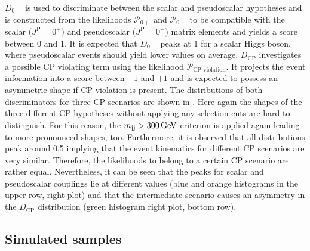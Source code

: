 $D_{0-}$ is used to discriminate between the scalar and pseudoscalar hypotheses and is constructed from the likelihoods $\mathcal{P}_{0+}$ and $\mathcal{P}_{0-}$ to be compatible with the scalar ($J^\text{P}=0^+$) and pseudoscalar ($J^\text{P}=0^-$) matrix elements and yields a score between 0 and 1. It is expected that
$D_{0-}$ peaks at 1 for a scalar Higgs boson, where pseudoscalar events should yield lower values on average. $D_\text{CP}$ investigates a possible CP violating term using the likelihood $\mathcal{P}_\text{CP violation}$. It projects the event information into a score between $-1$ and $+1$ and is expected to possess an asymmetric shape if CP violation is present.
The distributions of both discriminators for three CP scenarios
are shown in . \newline{}
Here again the shapes of the three different CP hypotheses without applying any selection cuts are hard to distinguish. For this reason, the $m_\text{jj}>\text{300\,{GeV}}$ criterion is applied again  
leading to more pronounced shapes, too.
Furthermore, it is observed that all distributions peak around 0.5 implying that the event kinematics for different CP scenarios are very similar. Therefore, the likelihoods to belong to a certain CP scenario are rather equal. Nevertheless, it can be seen that the peaks for scalar and pseudoscalar couplings lie at different values (blue and orange histograms in the upper row, right plot) and that the intermediate scenario
causes an asymmetry  in the $D_\text{CP}$ distribution (green histogram right plot, bottom row). 

\subsection{Simulated samples}

